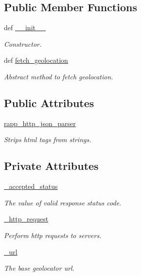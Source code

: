 \subsection*{Public Member Functions}
\begin{DoxyCompactItemize}
\item 
def \hyperlink{classrapp__geolocator_1_1geolocator__base_1_1GeolocatorBase_a4ec5ed46e51b673b2bd0cd94021a0128}{\-\_\-\-\_\-init\-\_\-\-\_\-}
\begin{DoxyCompactList}\small\item\em Constructor. \end{DoxyCompactList}\item 
def \hyperlink{classrapp__geolocator_1_1geolocator__base_1_1GeolocatorBase_ae7145ae156ac1d46542de3a03832db88}{fetch\-\_\-geolocation}
\begin{DoxyCompactList}\small\item\em Abstract method to fetch geolocation. \end{DoxyCompactList}\end{DoxyCompactItemize}
\subsection*{Public Attributes}
\begin{DoxyCompactItemize}
\item 
\hyperlink{classrapp__geolocator_1_1geolocator__base_1_1GeolocatorBase_ab425091819e4da22d68271fc98e849d1}{rapp\-\_\-http\-\_\-json\-\_\-parser}
\begin{DoxyCompactList}\small\item\em Strips html tags from strings. \end{DoxyCompactList}\end{DoxyCompactItemize}
\subsection*{Private Attributes}
\begin{DoxyCompactItemize}
\item 
\hyperlink{classrapp__geolocator_1_1geolocator__base_1_1GeolocatorBase_a2b470a5fd81cbe88922bce9127c1cdae}{\-\_\-accepted\-\_\-status}
\begin{DoxyCompactList}\small\item\em The value of valid response status code. \end{DoxyCompactList}\item 
\hyperlink{classrapp__geolocator_1_1geolocator__base_1_1GeolocatorBase_ab869b505130380af18703a32ca5982ed}{\-\_\-http\-\_\-request}
\begin{DoxyCompactList}\small\item\em Perform http requests to servers. \end{DoxyCompactList}\item 
\hyperlink{classrapp__geolocator_1_1geolocator__base_1_1GeolocatorBase_a67ea8297b7cfc1a51213a74a8b37e7d3}{\-\_\-url}
\begin{DoxyCompactList}\small\item\em The base geolocator url. \end{DoxyCompactList}\end{DoxyCompactItemize}
